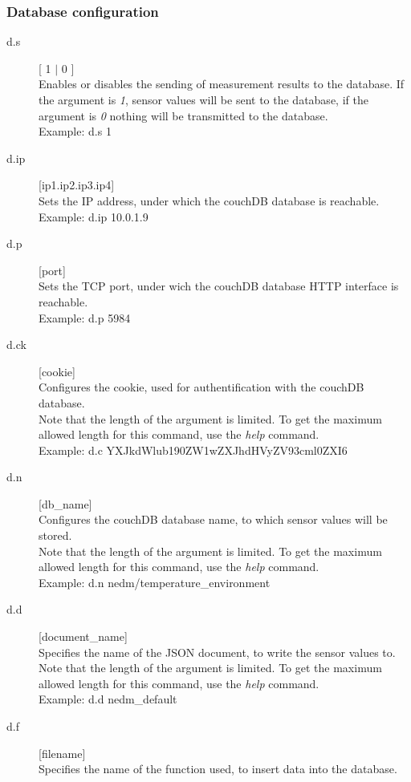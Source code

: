 \documentclass[a4paper]{scrreprt}
\begin{document}
\subsubsection{Database configuration}
\begin{description}
  \item[d.s] [ 1 $|$ 0 ]\\
    Enables or disables the sending of measurement results to the database. If the
    argument is \emph{1}, sensor values will be sent to the database, if the argument
    is \emph{0} nothing will be transmitted to the database.\\
    Example: d.s 1
  \item[d.ip] [ip1.ip2.ip3.ip4]\\
    Sets the IP address, under which the couchDB database is reachable.\\
    Example: d.ip 10.0.1.9
  \item[d.p] [port]\\
    Sets the TCP port, under wich the couchDB database HTTP interface is reachable.\\
    Example: d.p 5984
  \item[d.ck] [cookie]\\
    Configures the cookie, used for authentification with the couchDB database.\\
    Note that the length of the argument is limited. To get the maximum allowed
    length for this command, use the \emph{help} command.\\
    Example: d.c YXJkdWlub190ZW1wZXJhdHVyZV93cml0ZXI6
  \item[d.n] [db\_name]\\
    Configures the couchDB database name, to which sensor values will be stored.\\
    Note that the length of the argument is limited. To get the maximum allowed
    length for this command, use the \emph{help} command.\\
    Example: d.n nedm/temperature\_environment
  \item[d.d] [document\_name]\\
    Specifies the name of the JSON document, to write the sensor values to.
    Note that the length of the argument is limited. To get the maximum allowed
    length for this command, use the \emph{help} command.\\
    Example: d.d nedm\_default
  \item[d.f] [filename]\\
    Specifies the name of the function used, to insert data into the database.

\end{description}
\end{document}
